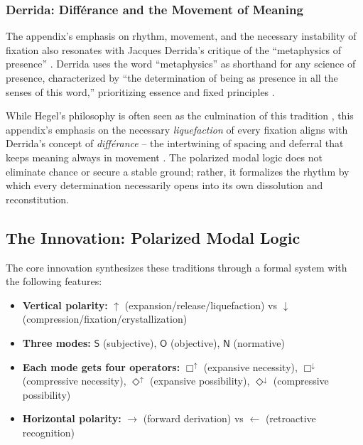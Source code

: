 \documentclass[12pt]{book}
\begin{document}
\subsubsection{Derrida: Différance and the Movement of Meaning}

The appendix's emphasis on rhythm, movement, and the necessary instability of fixation also resonates with Jacques Derrida's critique of the ``metaphysics of presence'' \parencite{Derrida2011}. Derrida uses the word ``metaphysics'' as shorthand for any science of presence, characterized by ``the determination of being as presence in all the senses of this word,'' prioritizing essence and fixed principles \parencite[p. xxi]{Derrida1997}.

While Hegel's philosophy is often seen as the culmination of this tradition \parencite{Derrida:1973, agamben_language_2006}, this appendix's emphasis on the necessary \textit{liquefaction} of every fixation aligns with Derrida's concept of \textit{différance} -- the intertwining of spacing and deferral that keeps meaning always in movement \parencite{Derrida:1973}. The polarized modal logic does not eliminate chance or secure a stable ground; rather, it formalizes the rhythm by which every determination necessarily opens into its own dissolution and reconstitution.

\subsection{The Innovation: Polarized Modal Logic}

The core innovation synthesizes these traditions through a formal system with the following features:

\begin{itemize}
\item \textbf{Vertical polarity:} $\uparrow$ (expansion/release/liquefaction) vs $\downarrow$ (compression/fixation/crystallization)
\item \textbf{Three modes:} $\mathsf{S}$ (subjective), $\mathsf{O}$ (objective), $\mathsf{N}$ (normative)
\item \textbf{Each mode gets four operators:} $\Box^{\uparrow}$ (expansive necessity), $\Box^{\downarrow}$ (compressive necessity), $\Diamond^{\uparrow}$ (expansive possibility), $\Diamond^{\downarrow}$ (compressive possibility)
\item \textbf{Horizontal polarity:} $\rightarrow$ (forward derivation) vs $\leftarrow$ (retroactive recognition)
\end{itemize}
\end{document}
